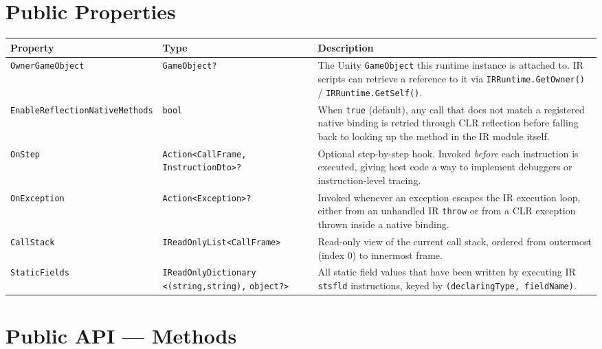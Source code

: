 \documentclass[11pt,a4paper]{article}
\newcommand{\code}[1]{\texttt{\small #1}}
\newcommand{\typename}[1]{\textcolor{typecolor}{\texttt{\small #1}}}
\begin{document}
\section{Public Properties}

\begin{longtable}{p{5.5cm}p{2cm}p{6.5cm}}
  \toprule
  \textbf{Property} & \textbf{Type} & \textbf{Description} \\
  \midrule
  \endhead
  \code{OwnerGameObject}               & \typename{GameObject?} &
    The Unity \typename{GameObject} this runtime instance is attached to.
    IR scripts can retrieve a reference to it via
    \code{IRRuntime.GetOwner()} / \code{IRRuntime.GetSelf()}. \\[0.4em]
  \code{EnableReflectionNativeMethods} & \code{bool} &
    When \code{true} (default), any call that does not match a registered
    native binding is retried through CLR reflection before falling back
    to looking up the method in the IR module itself. \\[0.4em]
  \code{OnStep}                        & \code{Action<CallFrame,} \code{InstructionDto>?} &
    Optional step-by-step hook. Invoked \emph{before} each instruction
    is executed, giving host code a way to implement debuggers or
    instruction-level tracing. \\[0.4em]
  \code{OnException}                   & \code{Action<Exception>?} &
    Invoked whenever an exception escapes the IR execution loop, either
    from an unhandled IR \code{throw} or from a CLR exception thrown
    inside a native binding. \\[0.4em]
  \code{CallStack}                     & \code{IReadOnlyList<CallFrame>} &
    Read-only view of the current call stack, ordered from outermost
    (index 0) to innermost frame. \\[0.4em]
  \code{StaticFields}                  & \code{IReadOnlyDictionary} \code{<(string,string),} \code{object?>} &
    All static field values that have been written by executing IR
    \code{stsfld} instructions, keyed by \texttt{(declaringType, fieldName)}. \\
  \bottomrule
\end{longtable}

\section{Public API --- Methods}
\end{document}
